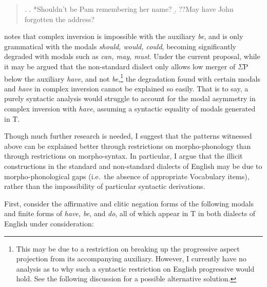 \singlespacing
\begin{quote}
\ex.
\a. *Shouldn't be Pam remembering her name?
\b. ??May have John forgotten the address?


\end{quote}
\onehalfspacing
\citet{johnson1988} notes that complex inversion is impossible with the auxiliary {\it be}, and is only grammatical with the modals {\it should, would, could}, becoming significantly degraded with modals such as {\it can, may, must}. Under the current proposal, while it may be argued that the non-standard dialect only allows low merger of $\Sigma$P below the auxiliary {\it have}, and not {\it be},\footnote{This may be due to a restriction on breaking up the progressive aspect projection from its accompanying auxiliary. However, I currently have no analysis as to why such a syntactic restriction on English progressive would hold. See the following discussion for a possible alternative solution.} the degradation found with certain modals and {\it have} in complex inversion cannot be explained so easily. That is to say, a purely syntactic analysis would struggle to account for the modal asymmetry in complex inversion with {\it have}, assuming a syntactic equality of modals generated in T.

Though much further research is needed, I suggest that the patterns witnessed above can be explained better through restrictions on morpho-phonology than through restrictions on morpho-syntax. In particular, I argue that the illicit constructions in the standard and non-standard dialects of English may be due to morpho-phonological gaps (i.e.\ the absence of appropriate Vocabulary items), rather than the impossibility of particular syntactic derivations.

First, consider the affirmative and clitic negation forms of the following modals and finite forms of {\it have, be}, and {\it do}, all of which appear in T in both dialects of English under consideration:


